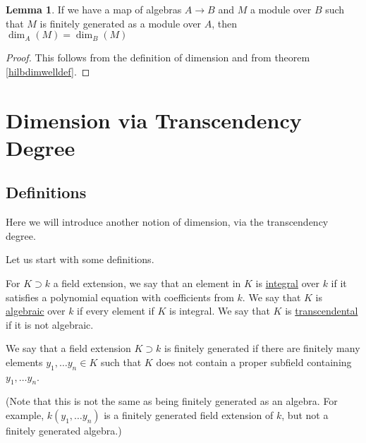\documentclass[12 pt]{article}
\theoremstyle{definition}
\newtheorem{lemma}[theorem]{Lemma}
\begin{document}
\begin{lemma} If we have a map of algebras $A \to B$ and $M$ a module over $B$ such that $M$ is finitely generated as a module over $A$, then $\dim_A(M)=\dim_B(M)$
\end{lemma}
\begin{proof} This follows from the definition of dimension and from theorem \ref{hilbdimwelldef}.
\end{proof}


\newpage





\section{Dimension via Transcendency Degree}

\subsection{Definitions}

Here we will introduce another notion of dimension, via the transcendency degree.

Let us start with some definitions.

\begin{definition} For $K \supset k$ a field extension, we say that an element in $K$ is \underline{integral} over $k$ if it satisfies a polynomial equation with coefficients from $k$. We say that $K$ is \underline{algebraic} over $k$ if every element if $K$ is integral. We say that $K$ is \underline{transcendental} if it is not algebraic.
\end{definition}


\begin{definition} We say that a field extension $K \supset k$ is finitely generated if there are finitely many elements $y_1, \ldots y_n \in K$ such that $K$ does not contain a proper subfield containing $y_1, \ldots y_n$.

(Note that this is not the same as being finitely generated as an algebra. For example, $k(y_1, \ldots y_n)$ is a finitely generated field extension of $k$, but not a finitely generated algebra.)
\end{definition}
\end{document}
